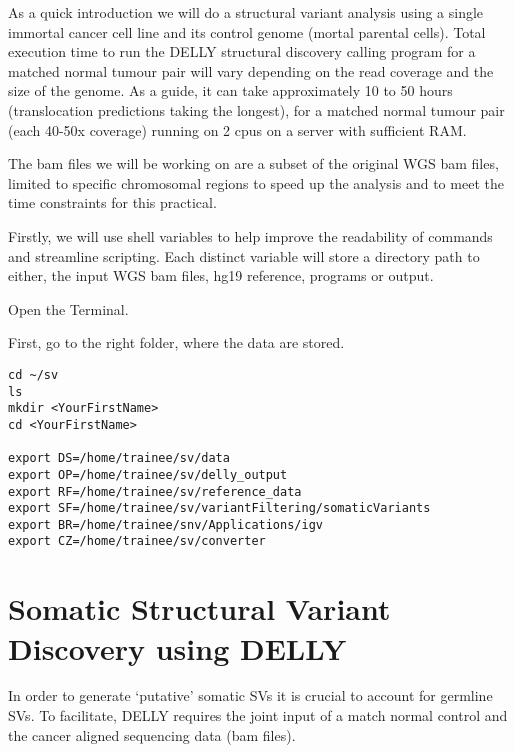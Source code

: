 \begin{note}
As a quick introduction we will do a structural variant analysis using a single immortal cancer cell line and its control genome (mortal parental cells). Total execution time to run the DELLY structural discovery calling program for a matched normal tumour pair will vary depending on the read coverage and the size of the genome. As a guide, it can take approximately 10 to 50 hours (translocation predictions taking the longest), for a matched normal tumour pair (each 40-50x coverage) running on 2 cpus on a server with sufficient RAM.

The bam files we will be working on are a subset of the original WGS bam files, limited to specific chromosomal regions to speed up the analysis and to meet the time constraints for this practical. 
\end{note}

\begin{information}
Firstly, we will use shell variables to help improve the readability of commands and streamline scripting. Each distinct variable will store a directory path to either, the input WGS bam files, hg19 reference, programs or output.

\end{information}

\begin{steps}
Open the Terminal.

First, go to the right folder, where the data are stored.
\begin{lstlisting}
cd ~/sv
ls
mkdir <YourFirstName>
cd <YourFirstName>

export DS=/home/trainee/sv/data
export OP=/home/trainee/sv/delly_output
export RF=/home/trainee/sv/reference_data
export SF=/home/trainee/sv/variantFiltering/somaticVariants
export BR=/home/trainee/snv/Applications/igv
export CZ=/home/trainee/sv/converter

\end{lstlisting}

\end{steps}

\section{Somatic Structural Variant Discovery using DELLY}

\begin{information}
In order to generate ‘putative’ somatic SVs it is crucial to account for germline SVs. To facilitate, DELLY requires the joint input of a match normal control and the cancer aligned sequencing data (bam files).
\end{information}

